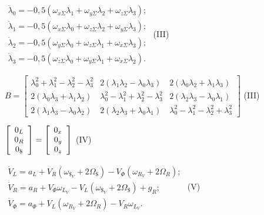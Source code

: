 $\begin{array}{l} 
{\dot{\lambda }_{0} =-0,5(\omega_{x\Sigma } \lambda_{1} +\omega_{y\Sigma } \lambda 
_{2} +\omega_{z\Sigma } \lambda_{3} );} \\ {\dot{\lambda }_{1} =-0,5(\omega_{x
\Sigma } \lambda_{0} +\omega_{z\Sigma } \lambda_{2} +\omega_{y\Sigma } \lambda 
_{3} );} \\ {\dot{\lambda }_{2} =-0,5(\omega_{y\Sigma } \lambda_{0} +\omega_{z
\Sigma } \lambda_{1} +\omega_{x\Sigma } \lambda_{3} );} \\ {\dot{\lambda }_{3} 
=-0,5(\omega_{z\Sigma } \lambda_{0} +\omega_{y\Sigma } \lambda_{1} +\omega_{x
\Sigma } \lambda_{2} ).} \end{array}$                           (III)



$B=\left[\begin{array}{ccc} {\lambda_{0}^{2} +\lambda_{1}^{2} -\lambda_{2}^{2} 
-\lambda_{3}^{2} } & {2(\lambda_{1} \lambda_{2} -\lambda_{0} \lambda_{3} )} 
& {2(\lambda_{0} \lambda_{2} +\lambda_{1} \lambda_{3} )} \\ {2(\lambda_{0} \lambda 
_{3} +\lambda_{1} \lambda_{2} )} & {\lambda_{0}^{2} -\lambda_{1}^{2} +\lambda 
_{2}^{2} -\lambda_{3}^{2} } & {2(\lambda_{2} \lambda_{3} -\lambda_{0} \lambda 
_{1} )} \\ {2(\lambda_{1} \lambda_{3} -\lambda_{0} \lambda_{2} )} & {2(\lambda 
_{2} \lambda_{3} +\lambda_{0} \lambda_{1} )} & {\lambda_{0}^{2} -\lambda_{1}^{2} 
-\lambda_{2}^{2} +\lambda_{3}^{2} } \end{array}\right]$           (III)



\textbf{$\left[\begin{array}{c} {0_{L} } \\ {0_{R} } \\ {0_{\$ } } \end{array}\right]=
\left[\begin{array}{c} {0_{x_{{\rm }} } } \\ {0_{y_{{\rm }} } } \\ {0_{z_{{\rm }} 
} } \end{array}\right]$}                                                   (IV) 



$\begin{array}{l} 
{\dot{V}_{L} =a_{L} +V_{R} \left(\omega_{\$_{V} } +2\Omega_{\$ } \right)-V_{\Phi 
} \left(\omega_{R_{V} } +2\Omega_{R} \right);} \\ {\dot{V}_{R} =a_{R} +V_{\Phi 
} \omega_{L_{V} } -V_{L} \left(\omega_{\$_{V} } +2\Omega_{\$ } \right)+g_{R} 
;} \\ {\dot{V}_{\Phi } =a_{\Phi } +V_{L} \left(\omega_{R_{V} } +2\Omega_{R} \right)-V_{R} 
\omega_{L_{V} } .} \end{array}$                       (V)





